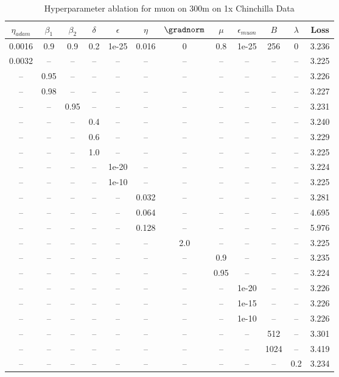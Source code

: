 \begin{table}[h!]
\centering
\caption{Hyperparameter ablation for muon on 300m on 1x Chinchilla Data}
\label{tab:ablation_muon_300m_on_1x_chinchilla_data}
\begin{tabular}{cccccccccccc}
\toprule
$\eta_{adam}$ & $\beta_1$ & $\beta_2$ & $\delta$ & $\epsilon$ & $\eta$ & $\gradnorm$ & $\mu$ & $\epsilon_{muon}$ & $B$ & $\lambda$ & Loss \\
\midrule
0.0016 & 0.9 & 0.9 & 0.2 & 1e-25 & 0.016 & 0 & 0.8 & 1e-25 & 256 & 0 & 3.236 \\
\midrule
0.0032 & -- & -- & -- & -- & -- & -- & -- & -- & -- & -- & 3.225 \\
-- & 0.95 & -- & -- & -- & -- & -- & -- & -- & -- & -- & 3.226 \\
-- & 0.98 & -- & -- & -- & -- & -- & -- & -- & -- & -- & 3.227 \\
-- & -- & 0.95 & -- & -- & -- & -- & -- & -- & -- & -- & 3.231 \\
-- & -- & -- & 0.4 & -- & -- & -- & -- & -- & -- & -- & 3.240 \\
-- & -- & -- & 0.6 & -- & -- & -- & -- & -- & -- & -- & 3.229 \\
-- & -- & -- & 1.0 & -- & -- & -- & -- & -- & -- & -- & 3.225 \\
-- & -- & -- & -- & 1e-20 & -- & -- & -- & -- & -- & -- & 3.224 \\
-- & -- & -- & -- & 1e-10 & -- & -- & -- & -- & -- & -- & 3.225 \\
-- & -- & -- & -- & -- & 0.032 & -- & -- & -- & -- & -- & 3.281 \\
-- & -- & -- & -- & -- & 0.064 & -- & -- & -- & -- & -- & 4.695 \\
-- & -- & -- & -- & -- & 0.128 & -- & -- & -- & -- & -- & 5.976 \\
-- & -- & -- & -- & -- & -- & 2.0 & -- & -- & -- & -- & 3.225 \\
-- & -- & -- & -- & -- & -- & -- & 0.9 & -- & -- & -- & 3.235 \\
-- & -- & -- & -- & -- & -- & -- & 0.95 & -- & -- & -- & 3.224 \\
-- & -- & -- & -- & -- & -- & -- & -- & 1e-20 & -- & -- & 3.226 \\
-- & -- & -- & -- & -- & -- & -- & -- & 1e-15 & -- & -- & 3.226 \\
-- & -- & -- & -- & -- & -- & -- & -- & 1e-10 & -- & -- & 3.226 \\
-- & -- & -- & -- & -- & -- & -- & -- & -- & 512 & -- & 3.301 \\
-- & -- & -- & -- & -- & -- & -- & -- & -- & 1024 & -- & 3.419 \\
-- & -- & -- & -- & -- & -- & -- & -- & -- & -- & 0.2 & 3.234 \\
\bottomrule
\end{tabular}
\end{table}

